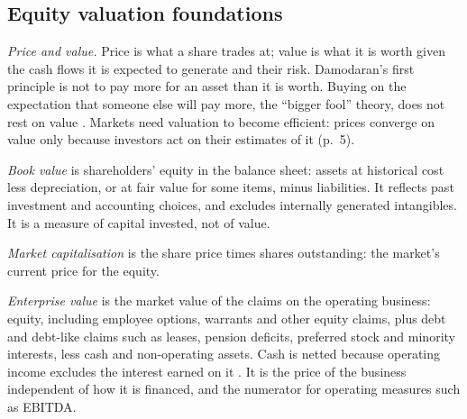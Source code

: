 \subsection{Equity valuation foundations}

\begin{qfdefinition}\label{def:price-value-indicators}
 \emph{Price and value.} Price is what a share trades at; value is what it is worth given the cash flows it is expected to generate and their risk. Damodaran's first principle is not to pay more for an asset than it is worth. Buying on the expectation that someone else will pay more, the ``bigger fool'' theory, does not rest on value \citep[p.~1]{investment-valuation-2012}. Markets need valuation to become efficient: prices converge on value only because investors act on their estimates of it (p.~5).

\emph{Book value} is shareholders' equity in the balance sheet: assets at historical cost less depreciation, or at fair value for some items, minus liabilities. It reflects past investment and accounting choices, and excludes internally generated intangibles. It is a measure of capital invested, not of value.

\emph{Market capitalisation} is the share price times shares outstanding: the market's current price for the equity.

\emph{Enterprise value} is the market value of the claims on the operating business: equity, including employee options, warrants and other equity claims, plus debt and debt-like claims such as leases, pension deficits, preferred stock and minority interests, less cash and non-operating assets. Cash is netted because operating income excludes the interest earned on it \citep[pp.~500--501]{investment-valuation-2012}. It is the price of the business independent of how it is financed, and the numerator for operating measures such as EBITDA.


\end{qfdefinition}
